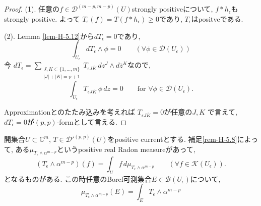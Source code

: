 \begin{proof}

(1). 任意の$f\in\mathcal{D}^{(m-p,m-p)}(U)$strongly positiveについて, 
$f \ast h_\epsilon$もstrongly positive. 
よって
$T_\epsilon(f)=T(f \ast h_\epsilon)\geq 0$であり, 
$T_\epsilon$はpositveである. 

(2). Lemma \ref{lem-H-5.12}から$dT_\epsilon=0$であり, 
\begin{equation*}
\int_{U_\epsilon}dT_\epsilon\wedge\phi=0
\qquad
(\forall\phi\in\mathcal{D}(U_\epsilon))
\end{equation*}
今
$
dT_\epsilon
=
\sum_{\substack{J,K\subset\{1,\ldots,m\}\\|J|+|K|=p+1}}
T_{\epsilon J\bar K}\,dz^J\wedge d\bar z^K
$なので, 
\begin{equation*}
\int_{U_\epsilon}T_{\epsilon J\bar K}\,\phi\,dz=0
\qquad
\text{for }\forall\phi\in\mathcal{D}(U_\epsilon).
\end{equation*}

Approximationとのたたみ込みを考えれば
$
T_{\epsilon J\bar K}=0
$が任意の$J,K$
で言えて, 
$dT_\epsilon=0$が$(p,p)$-formとして言える. 
\end{proof}


\begin{tcolorbox}[mybox]
\begin{lem}
\label{lem-H-5.15}
開集合$U\subset\mathbb{C}^m$, $T\in\mathcal{D}'^{(p,p)}(U)$をpositive currentとする. 
補足\ref{rem-H-5.8}によって, 
ある$\mu_{T_\epsilon\wedge\alpha^{m-p}}$というpositive real Radon measureがあって, 
\begin{equation*}
(T_\epsilon\wedge\alpha^{m-p})(f)
=
\int_U f\,d\mu_{T_\epsilon\wedge\alpha^{m-p}}
\qquad
\left(
\forall f\in\mathcal{K}(U_\epsilon)
\right).
\end{equation*}
となるものがある. この時任意のBorel可測集合$E\in\mathcal{B}(U_\epsilon)$について, 
\begin{equation*}
\mu_{T_\epsilon\wedge\alpha^{m-p}}(E)
=
\int_E T_\epsilon\wedge\alpha^{m-p}
\end{equation*}
\end{lem}
\end{tcolorbox}

